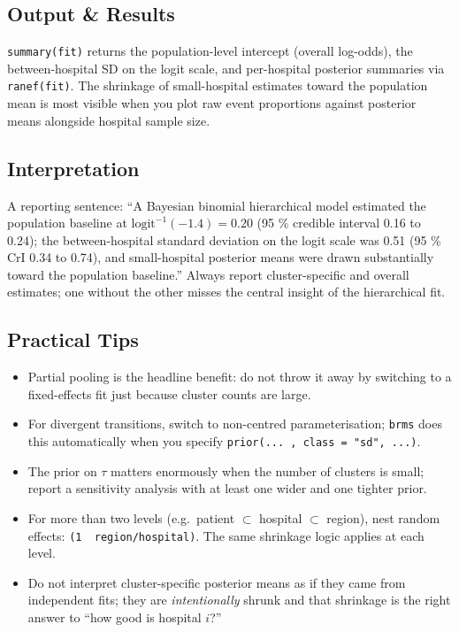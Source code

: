 \documentclass[
]{article}
\providecommand{\tightlist}{%
  \setlength{\itemsep}{0pt}\setlength{\parskip}{0pt}}
\begin{document}
\subsection{Output \& Results}\label{output-results}

\texttt{summary(fit)} returns the population-level intercept (overall
log-odds), the between-hospital SD on the logit scale, and per-hospital
posterior summaries via \texttt{ranef(fit)}. The shrinkage of
small-hospital estimates toward the population mean is most visible when
you plot raw event proportions against posterior means alongside
hospital sample size.

\subsection{Interpretation}\label{interpretation}

A reporting sentence: ``A Bayesian binomial hierarchical model estimated
the population baseline at \(\mathrm{logit}^{-1}(-1.4) = 0.20\) (95 \%
credible interval 0.16 to 0.24); the between-hospital standard deviation
on the logit scale was 0.51 (95 \% CrI 0.34 to 0.74), and small-hospital
posterior means were drawn substantially toward the population
baseline.'' Always report cluster-specific and overall estimates; one
without the other misses the central insight of the hierarchical fit.

\subsection{Practical Tips}\label{practical-tips}

\begin{itemize}
\tightlist
\item
  Partial pooling is the headline benefit: do not throw it away by
  switching to a fixed-effects fit just because cluster counts are
  large.
\item
  For divergent transitions, switch to non-centred parameterisation;
  \texttt{brms} does this automatically when you specify
  \texttt{prior(...\ ,\ class\ =\ "sd",\ ...)}.
\item
  The prior on \(\tau\) matters enormously when the number of clusters
  is small; report a sensitivity analysis with at least one wider and
  one tighter prior.
\item
  For more than two levels (e.g.~patient \(\subset\) hospital
  \(\subset\) region), nest random effects:
  \texttt{(1\ \textbar{}\ region/hospital)}. The same shrinkage logic
  applies at each level.
\item
  Do not interpret cluster-specific posterior means as if they came from
  independent fits; they are \emph{intentionally} shrunk and that
  shrinkage is the right answer to ``how good is hospital \(i\)?''
\end{itemize}
\end{document}
